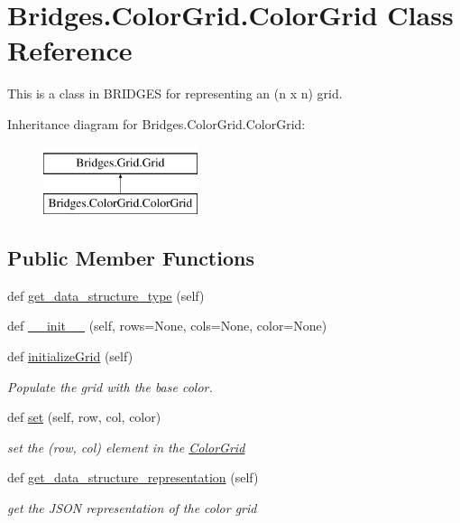 \hypertarget{class_bridges_1_1_color_grid_1_1_color_grid}{}\section{Bridges.\+Color\+Grid.\+Color\+Grid Class Reference}
\label{class_bridges_1_1_color_grid_1_1_color_grid}


This is a class in B\+R\+I\+D\+G\+ES for representing an (n x n) grid.  


Inheritance diagram for Bridges.\+Color\+Grid.\+Color\+Grid\+:\begin{figure}[H]
\begin{center}
\leavevmode
\includegraphics[height=2.000000cm]{class_bridges_1_1_color_grid_1_1_color_grid}
\end{center}
\end{figure}
\subsection*{Public Member Functions}
\begin{DoxyCompactItemize}
\item 
def \mbox{\hyperlink{class_bridges_1_1_color_grid_1_1_color_grid_a34e609e12f3f5fa2bf8917b2bd2b5489}{get\+\_\+data\+\_\+structure\+\_\+type}} (self)
\item 
def \mbox{\hyperlink{class_bridges_1_1_color_grid_1_1_color_grid_abe3330968006d02bf8eecdb73109fffc}{\+\_\+\+\_\+init\+\_\+\+\_\+}} (self, rows=None, cols=None, color=None)
\item 
def \mbox{\hyperlink{class_bridges_1_1_color_grid_1_1_color_grid_add4d644d5a7703acf2569a6fdd95f814}{initialize\+Grid}} (self)
\begin{DoxyCompactList}\small\item\em Populate the grid with the base color. \end{DoxyCompactList}\item 
def \mbox{\hyperlink{class_bridges_1_1_color_grid_1_1_color_grid_a0389bb1397a02cc665214f91e9c359a2}{set}} (self, row, col, color)
\begin{DoxyCompactList}\small\item\em set the (row, col) element in the \mbox{\hyperlink{class_bridges_1_1_color_grid_1_1_color_grid}{Color\+Grid}} \end{DoxyCompactList}\item 
def \mbox{\hyperlink{class_bridges_1_1_color_grid_1_1_color_grid_a995dc5674b9fb6c405cd78f5db78f3ab}{get\+\_\+data\+\_\+structure\+\_\+representation}} (self)
\begin{DoxyCompactList}\small\item\em get the J\+S\+ON representation of the color grid \end{DoxyCompactList}\end{DoxyCompactItemize}

